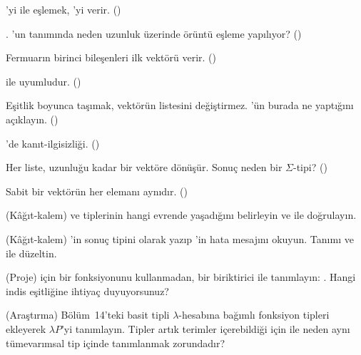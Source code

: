 \begin{alistirmalar}
 'yi  ile eşlemek, 'yi verir. ()

 . 'un tanımında neden
uzunluk üzerinde örüntü eşleme yapılıyor? ()

 Fermuarın birinci bileşenleri ilk vektörü verir. ()

  ile  uyumludur. ()

 Eşitlik boyunca taşımak, vektörün listesini değiştirmez.
'ün burada ne yaptığını açıklayın. ()

 'de kanıt-ilgisizliği. ()

 Her liste, uzunluğu kadar bir vektöre dönüşür. Sonuç neden bir
$Σ$-tipi? ()

 Sabit bir vektörün her elemanı aynıdır. ()

 (Kâğıt-kalem)  ve
 tiplerinin hangi evrende yaşadığını
belirleyin ve  ile doğrulayın.

 (Kâğıt-kalem) 'in sonuç tipini  olarak yazıp \Lean{}'in hata mesajını okuyun. Tanımı
 ve  ile düzeltin.

 (Proje)  için bir  fonksiyonunu
 kullanmadan, bir biriktirici ile tanımlayın:
. Hangi indis eşitliğine
ihtiyaç duyuyorsunuz?

 (Araştırma) Bölüm~14'teki basit tipli $\lambda$-hesabına
bağımlı fonksiyon tipleri ekleyerek $\lambda P$'yi tanımlayın. Tipler artık
terimler içerebildiği için  ile  neden aynı tümevarımsal
tip içinde tanımlanmak zorundadır?
\end{alistirmalar}
